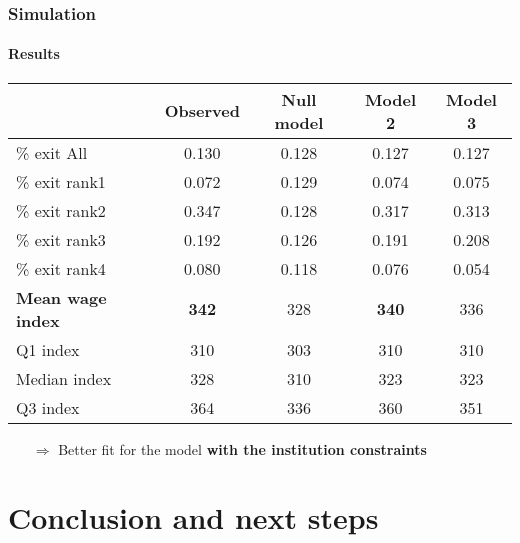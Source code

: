 \documentclass[xcolor=table,ignorenonframetext,12pt]{beamer}
\newenvironment{choixmarges}[2]{\begin{list}{}{%
\setlength{\topsep}{0pt}%
\setlength{\leftmargin}{0pt}%
\setlength{\rightmargin}{0pt}%
\setlength{\listparindent}{\parindent}%
\setlength{\itemindent}{\parindent}%
\setlength{\parsep}{0pt plus 1pt}%
\addtolength{\leftmargin}{#1}%
\addtolength{\rightmargin}{#2}%
}\item }{\end{list}}
\begin{document}
\begin{frame}
\frametitle{Simulation}
\framesubtitle{Results}
\begin{choixmarges}{-0.5cm}{-0.5cm}

\begin{table}[ht]
\centering
\begingroup\footnotesize
\begin{tabular}{lcccc}
\toprule
& Observed & Null model & Model 2 & Model 3 \\ 
\midrule
\% exit All & 0.130 & 0.128 & 0.127 & 0.127 \\ 
\% exit rank1 & 0.072 & 0.129 & 0.074 & 0.075 \\ 
\% exit rank2 & 0.347 & 0.128 & 0.317 & 0.313 \\ 
\% exit rank3 & 0.192 & 0.126 & 0.191 & 0.208 \\ 
\% exit rank4 & 0.080 & 0.118 & 0.076 & 0.054 \\ 
\midrule
\textbf{Mean wage index }& \textbf{342} & 328 & \textbf{340} & 336 \\ 
Q1 index & 310 & 303 & 310 & 310 \\ 
Median index & 328 & 310 & 323 & 323 \\ 
Q3 index & 364 & 336 & 360 & 351 \\ 
\bottomrule 
\end{tabular}
\endgroup
\end{table}

\vspace{0.2cm}
\begin{itemize}
\item[$\Rightarrow$] Better fit for the model \textbf{with the institution constraints}

\end{itemize}


\end{choixmarges}

\end{frame}



\section{Conclusion and next steps}
\end{document}
